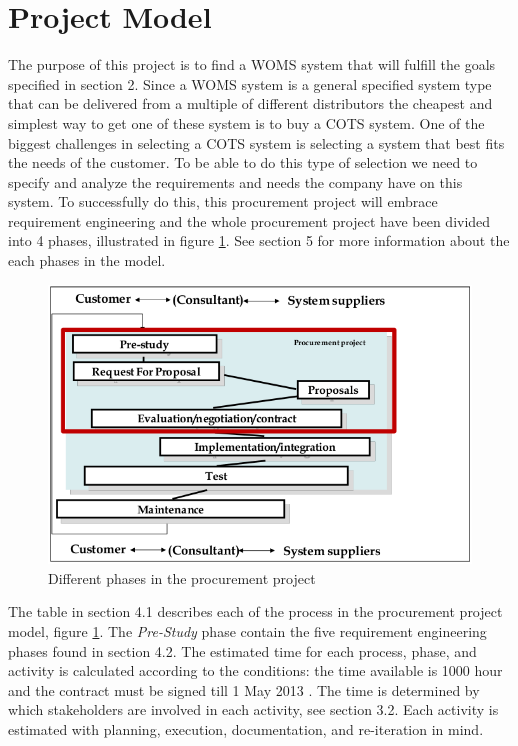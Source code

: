 \documentclass[a4paper]{article}
\begin{document}
\section{Project Model} 
\label{sec:project_model}
The purpose of this project is to find a WOMS system that will fulfill the goals specified in section 2. Since a WOMS system is a general specified system type that can be delivered from a multiple of different distributors the cheapest and simplest way to get one of these system is to buy a COTS system. One of the biggest challenges in selecting a COTS system is selecting a system that best fits the needs of the customer. To be able to do this type of selection we need to specify and analyze the requirements and needs the company have on this system. To successfully do this, this procurement project will embrace requirement engineering and the whole procurement project have been divided into 4 phases, illustrated in figure \ref{figure:procure}. See section 5 for more information about the each phases in the model.
\begin{figure}[H]
	\includegraphics[width=1\textwidth]{images/procurement.png}
	\caption{Different phases in the procurement project \cite{A}}
	\label{figure:procure}
\end{figure}
The table in section 4.1 describes each of the process in the procurement project model, figure \ref{figure:procure}. The \emph{Pre-Study} phase contain the five requirement engineering phases found in section 4.2. The estimated time for each process, phase, and activity is calculated according to the conditions: the time available is 1000 hour and the contract must be signed till 1 May 2013 \cite{I}. The time is determined by which stakeholders are involved in each activity, see section 3.2. Each activity is estimated with planning, execution, documentation, and re-iteration in mind.
\end{document}
